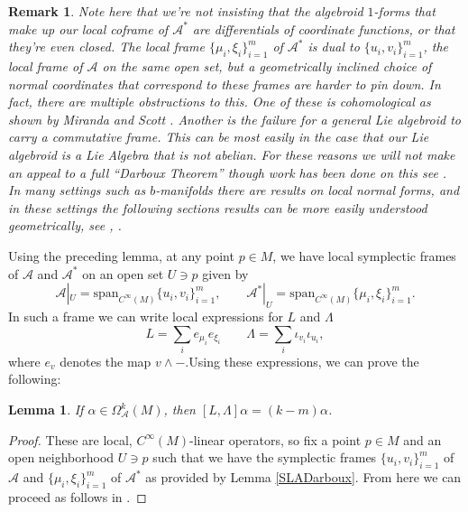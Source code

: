 \documentclass{amsart}
\newtheorem{lemma}[theorem]{Lemma}
\newtheorem{remark}[theorem]{Remark}
\newcommand{\A}{\mathcal{A}}
\theoremstyle{definition}
\begin{document}
\begin{remark}
    Note here that we're not insisting that the algebroid $1$-forms that make up our local coframe of $\A^*$ are differentials of coordinate functions, or that they're even closed. The local frame $\{\mu_i,\xi_i\}_{i=1}^m$ of $\A^*$ is dual to $\{u_i,v_i\}_{i=1}^m$, the local frame of $\A$ on the same open set, but a geometrically inclined choice of normal coordinates that correspond to these frames are harder to pin down. In fact, there are multiple obstructions to this. One of these is cohomological as shown by Miranda and Scott \cite[Theorem 29]{Miranda_2020}. Another is the failure for a general Lie algebroid to carry a commutative frame. This can be most easily in the case that our Lie algebroid is a Lie Algebra that is not abelian. For these reasons we will not make an appeal to a full ``Darboux Theorem'' though work has been done on this see \cite{Lin_2023}. In many settings such as $b$-manifolds there are results on local normal forms, and in these settings the following sections results can be more easily understood geometrically, see \cite{Matveeva_2023}, \cite{Miranda_2020}.
\end{remark}
Using the preceding lemma, at any point $p \in M$, we have local symplectic frames of $\A$ and $\A^*$ on an open set $U \ni p$ given by
\begin{equation*}
    \A|_U = \mathrm{span}_{C^\infty(M)}\{u_i,v_i\}_{i=1}^m,  \qquad
    \A^*|_U = \mathrm{span}_{C^\infty(M)}\{\mu_i,\xi_i\}_{i=1}^m.
\end{equation*}
In such a frame we can write local expressions for $L$ and $\Lambda$
\begin{equation*}
    L = \sum_i e_{\mu_i}e_{\xi_i} \qquad \Lambda =\sum_i \iota_{v_i}\iota_{u_i},
\end{equation*}
where $e_v$ denotes the map $v \wedge -$.Using these expressions, we can prove the following:
\begin{lemma}\label{KahlerWeil}
    If $\alpha \in \Omega^k_\A(M)$, then $[L,\Lambda]\alpha=(k-m)\alpha$.
\end{lemma}
\begin{proof}
    These are local, $C^\infty(M)$-linear operators, so fix a point $p \in M$ and an open neighborhood $U \ni p$ such that we have the symplectic frames $\{u_i,v_i\}_{i=1}^m$ of $\A$ and $\{\mu_i , \xi_i \}_{i=1}^m$ of $\A^*$ as provided by Lemma \ref{SLADarboux}. From here we can proceed as follows in \cite[Page 8]{Shlomonotes}.
\end{proof}
\end{document}
